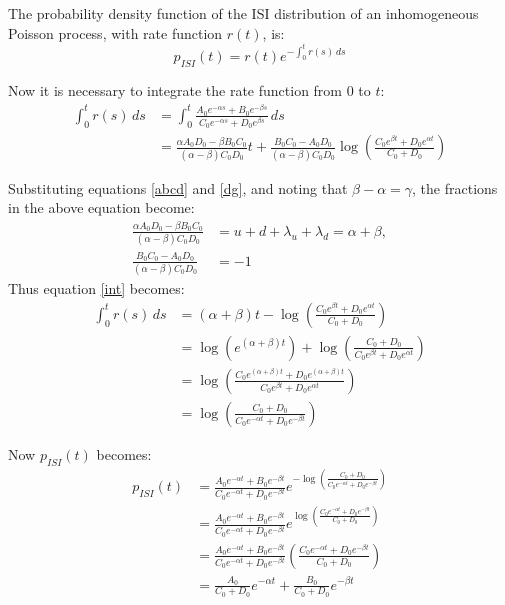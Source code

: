The probability density function of the ISI distribution of an inhomogeneous Poisson process, with rate function $r(t)$, is:
\begin{equation}
p_{ISI}(t) = r(t) e^{-\int_0^t r(s)\,ds}
\end{equation}

Now it is necessary to integrate the rate function from $0$ to $t$:
\begin{equation}
\begin{split}
\label{int}
\int_0^t r(s)\,ds &= \int_0^t  \frac{A_0e^{-\alpha s}+B_0e^{-\beta s}}{C_0e^{-\alpha s} + D_0e^{\beta s}}\,ds\\ 
&= \frac{\alpha A_0D_0 - \beta B_0 C_0}{(\alpha - \beta)C_0D_0}t + \frac{B_0 C_0-A_0D_0}{(\alpha - \beta)C_0D_0} \log\left({\frac{C_0e^{\beta t} + D_0e^{\alpha t}}{C_0 + D_0} }\right)
\end{split}
\end{equation}

Substituting equations \ref{abcd} and \ref{dg}, and noting that $\beta-\alpha=\gamma$, the fractions in the above equation become:
\begin{equation}
\begin{split}
\frac{\alpha A_0D_0 - \beta B_0 C_0}{(\alpha - \beta)C_0D_0} &= u+d+\lambda_u+\lambda_d = \alpha+\beta,\\
 \frac{B_0 C_0-A_0D_0}{(\alpha - \beta)C_0D_0} &= -1
\end{split}
\end{equation}
Thus equation \ref{int} becomes:
\begin{equation}
\begin{split}
\int_0^t r(s)\,ds &= (\alpha+\beta)t - \log\left( {\frac{C_0e^{\beta t} + D_0e^{\alpha t}}{C_0 + D_0} }\right) \\
&= \log\left( e^{(\alpha+\beta)t}\right) + \log \left( \frac{C_0 +D_0}{C_0e^{\beta t}+ D_0e^{\alpha t}}\right)\\
&= \log \left( \frac{C_0e^{(\alpha+\beta)t}+D_0e^{(\alpha+\beta)t}}{C_0e^{\beta t}+D_0e^{\alpha t}}\right)\\
&= \log \left( \frac{C_0+D_0}{C_0e^{-\alpha t}+D_0e^{-\beta t}}\right)
\end{split}
\end{equation}

Now $p_{ISI}(t)$ becomes:
\begin{equation}
\begin{split}
p_{ISI}(t) &= \frac{A_0e^{-\alpha t}+B_0e^{-\beta t}}{C_0e^{-\alpha t} + D_0e^{-\beta t}}e^{-\log \left( \frac{C_0+D_0}{C_0e^{-\alpha t}+D_0e^{-\beta t}}\right)}\\
& = \frac{A_0e^{-\alpha t}+B_0e^{-\beta t}}{C_0e^{-\alpha t} + D_0e^{-\beta t}}e^{\log \left( \frac{C_0e^{-\alpha t}+D_0e^{-\beta t}}{C_0+D_0}\right)}\\
&= \frac{A_0e^{-\alpha t}+B_0e^{-\beta t}}{C_0e^{-\alpha t} + D_0e^{-\beta t}}\left( \frac{C_0e^{-\alpha t}+D_0e^{-\beta t}}{C_0+D_0}\right)\\
&= \frac{A_0}{C_0+D_0}e^{-\alpha t} + \frac{B_0}{C_0+D_0}e^{-\beta t}
\end{split}
\end{equation}


